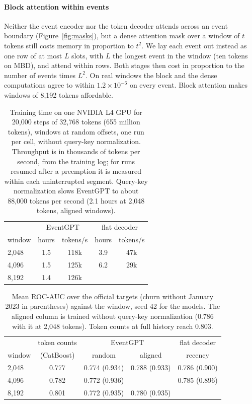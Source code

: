 \documentclass[12pt]{article}
\begin{document}
\paragraph{Block attention within events}\label{sec:packed}

Neither the event encoder nor the token decoder attends across an event boundary (Figure~\ref{fig:masks}), but a dense attention mask over a window of $t$ tokens still costs memory in proportion to $t^2$. We lay each event out instead as one row of at most $L$ slots, with $L$ the longest event in the window (ten tokens on MBD), and attend within rows. Both stages then cost in proportion to the number of events times $L^2$. On real windows the block and the dense computations agree to within $1.2 \times 10^{-6}$ on every event. Block attention makes windows of 8,192 tokens affordable.

\begin{table}[htbp]
\centering
\caption{Training time on one NVIDIA L4 GPU for 20,000 steps of 32,768 tokens (655 million tokens), windows at random offsets, one run per cell, without query-key normalization. Throughput is in thousands of tokens per second, from the training log; for runs resumed after a preemption it is measured within each uninterrupted segment. Query-key normalization slows EventGPT to about 88,000 tokens per second (2.1 hours at 2,048 tokens, aligned windows).}
\label{tab:gpu}
\begin{tabular}{lcccc}
\toprule
 & \multicolumn{2}{c}{EventGPT} & \multicolumn{2}{c}{flat decoder} \\
window & hours & tokens/s & hours & tokens/s \\
\midrule
2,048 & 1.5 & 118k & 3.9 & 47k \\
4,096 & 1.5 & 125k & 6.2 & 29k \\
8,192 & 1.4 & 126k & & \\
\bottomrule
\end{tabular}
\end{table}

\begin{table}[htbp]
\centering
\caption{Mean ROC-AUC over the official targets (churn without January 2023 in parentheses) against the window, seed 42 for the models. The aligned column is trained without query-key normalization (0.786 with it at 2,048 tokens). Token counts at full history reach 0.803.}
\label{tab:window}
\begin{tabular}{lcccc}
\toprule
 & token counts & \multicolumn{2}{c}{EventGPT} & flat decoder \\
window & (CatBoost) & random & aligned & recency \\
\midrule
2,048 & 0.777 & 0.774 (0.934) & 0.788 (0.933) & 0.786 (0.900) \\
4,096 & 0.782 & 0.772 (0.936) & & 0.785 (0.896) \\
8,192 & 0.801 & 0.772 (0.935) & 0.780 (0.935) & \\
\bottomrule
\end{tabular}
\end{table}
\end{document}
